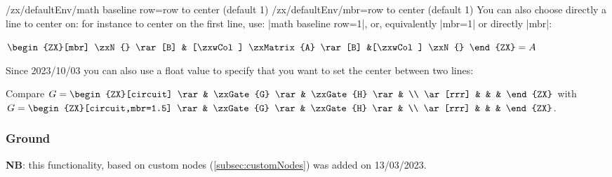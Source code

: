 \documentclass[a4paper,doc2]{ltxdoc} %
\begin{document}
{\begin{pgfmanualentry}
  \def\extrakeytext{style, }
  \makeatletter%
  \extractkey/zx/defaultEnv/math baseline row=row to center (default {1})\@nil%
  \extractkey/zx/defaultEnv/mbr=row to center (default {1})\@nil%
  \makeatother
  You can also choose directly a line to center on: for instance to center on the first line, use: |math baseline row=1|, or, equivalently |mbr=1| or directly |mbr|:
\begin{codeexample}[width=0pt]
  $\begin{ZX}[mbr]
    \zxN{} \rar[B] & [\zxwCol] \zxMatrix{A} \rar[B] &[\zxwCol] \zxN{}
  \end{ZX} = A$
\end{codeexample}
Since 2023/10/03 you can also use a float value to specify that you want to set the center between two lines:
\begin{codeexample}[width=0pt]
  Compare $G = \begin{ZX}[circuit]
    \rar     & \zxGate{G} \rar & \zxGate{H} \rar & \\
    \ar[rrr] &                 &                 & 
  \end{ZX}$ with $G = \begin{ZX}[circuit,mbr=1.5]
    \rar     & \zxGate{G} \rar & \zxGate{H} \rar & \\
    \ar[rrr] &                 &                 & 
  \end{ZX}$.
\end{codeexample}
\end{pgfmanualentry}

\subsubsection{Ground}

\textbf{NB}: this functionality, based on custom nodes (\cref{subsec:customNodes}) was added on 13/03/2023.

}
\end{document}
